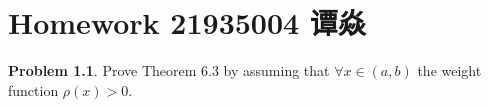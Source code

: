 \documentclass[a4paper]{book}
\makeatletter
\newcommand{\voidenvironment}[1]{%
  \expandafter\providecommand\csname env@#1@save@env\endcsname{}%
  \expandafter\providecommand\csname env@#1@process\endcsname{}%
  \@ifundefined{#1}{}{\RenewEnviron{#1}{}}%
}
\numberwithin{equation}{chapter}
\theoremstyle{definition}
\newtheorem{pro}[exm]{Problem}
\makeatother
\begin{document}
\pagestyle{empty}
% 



\setcounter{chapter}{7}




\chapter{Homework 21935004 谭焱}


\begin{pro}
  Prove Theorem 6.3 by assuming that $\forall x \in (a,b)$ the weight function $\rho(x) > 0$.
\end{pro}
\end{document}
